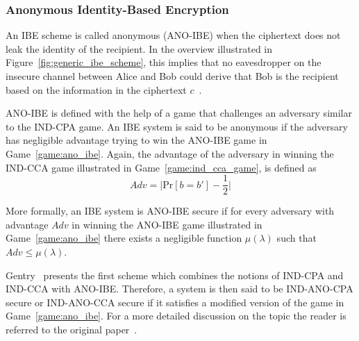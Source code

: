 \subsubsection{Anonymous Identity-Based Encryption}
An IBE scheme is called anonymous (ANO-IBE) when the ciphertext does not leak the identity of the recipient. In the overview illustrated in Figure~\ref{fig:generic_ibe_scheme}, this implies that no eavesdropper on the insecure channel between Alice and Bob could derive that Bob is the recipient based on the information in the ciphertext $c$~\cite{art:BoyenW06}.

ANO-IBE is defined with the help of a game that challenges an adversary similar to the IND-CPA game. An IBE system is said to be anonymous if the adversary has negligible advantage trying to win the ANO-IBE game in Game~\ref{game:ano_ibe}. Again, the advantage of the adversary in winning the IND-CCA game illustrated in Game~\ref{game:ind_cca_game}, is defined as
\begin{equation*}
 Adv = \lvert \textrm{Pr} \left[ b = b' \right] - \frac{1}{2} \rvert
\end{equation*}

More formally, an IBE system is ANO-IBE secure if for every adversary with advantage $Adv$ in winning the ANO-IBE game illustrated in Game~\ref{game:ano_ibe} there exists a negligible function $\mu \left( \lambda \right)$ such that $Adv \leq \mu \left( \lambda \right)$.

Gentry~\cite{art:Gentry06} presents the first scheme which combines the notions of IND-CPA and IND-CCA with ANO-IBE. Therefore, a system is then said to be IND-ANO-CPA secure or IND-ANO-CCA secure if it satisfies a modified version of the game in Game~\ref{game:ano_ibe}. For a more detailed discussion on the topic the reader is referred to the original paper~\cite{art:Gentry06}.

